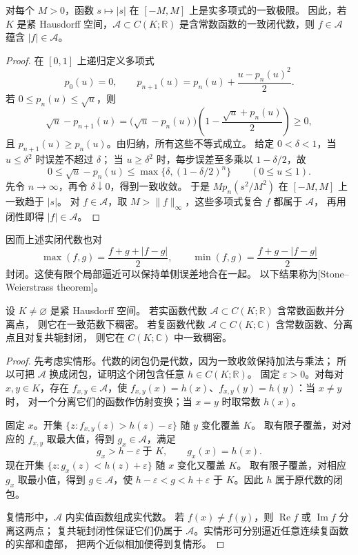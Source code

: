 \begin{lemma}[绝对值的多项式逼近]
\label{b1:lem:29-absolute-polynomial}
对每个 \(M>0\)，函数 \(s\mapsto|s|\) 在 \([-M,M]\) 上是实多项式的一致极限。
因此，若 \(K\) 是紧 Hausdorff 空间，\(\mathcal A\subset C(K;\mathbb R)\)
是含常数函数的一致闭代数，则 \(f\in\mathcal A\) 蕴含 \(|f|\in\mathcal A\)。
\end{lemma}
\begin{proof}
在 \([0,1]\) 上递归定义多项式
\[
 p_0(u)=0,\qquad p_{n+1}(u)=p_n(u)+\frac{u-p_n(u)^2}{2}.
\]
若 \(0\leq p_n(u)\leq\sqrt u\)，则
\[
 \sqrt u-p_{n+1}(u)
 =\bigl(\sqrt u-p_n(u)\bigr)
  \left(1-\frac{\sqrt u+p_n(u)}2\right)\geq0,
\]
且 \(p_{n+1}(u)\geq p_n(u)\)。由归纳，所有这些不等式成立。
给定 \(0<\delta<1\)，当 \(u\leq\delta^2\) 时误差不超过 \(\delta\)；
当 \(u\geq\delta^2\) 时，每步误差至多乘以 \(1-\delta/2\)，故
\[
 0\leq\sqrt u-p_n(u)\leq
 \max\{\delta,(1-\delta/2)^n\}\qquad(0\leq u\leq1).
\]
先令 \(n\to\infty\)，再令 \(\delta\downarrow0\)，得到一致收敛。
于是 \(Mp_n(s^2/M^2)\) 在 \([-M,M]\) 上一致趋于 \(|s|\)。
对 \(f\in\mathcal A\)，取 \(M>\|f\|_\infty\)，这些多项式复合 \(f\) 都属于 \(\mathcal A\)，
再用闭性即得 \(|f|\in\mathcal A\)。
\end{proof}

因而上述实闭代数也对
\[
 \max(f,g)=\frac{f+g+|f-g|}{2},\qquad
 \min(f,g)=\frac{f+g-|f-g|}{2}
\]
封闭。这使有限个局部逼近可以保持单侧误差地合在一起。
以下结果称为[Stone--Weierstrass theorem]。

\begin{theorem}
\label{b1:thm:29-stone-weierstrass}
设 \(K\ne\varnothing\) 是紧 Hausdorff 空间。
若实函数代数 \(\mathcal A\subset C(K;\mathbb R)\) 含常数函数并分离点，
则它在一致范数下稠密。
若复函数代数 \(\mathcal A\subset C(K;\mathbb C)\) 含常数函数、分离点且对复共轭封闭，
则它在 \(C(K;\mathbb C)\) 中一致稠密。
\end{theorem}
\begin{proof}
先考虑实情形。代数的闭包仍是代数，因为一致收敛保持加法与乘法；
所以可把 \(\mathcal A\) 换成闭包，证明这个闭包含任意 \(h\in C(K;\mathbb R)\)。
固定 \(\varepsilon>0\)。对每对 \(x,y\in K\)，存在 \(f_{x,y}\in\mathcal A\)，使
\(f_{x,y}(x)=h(x)\)、\(f_{x,y}(y)=h(y)\)：当 \(x\ne y\) 时，
对一个分离它们的函数作仿射变换；当 \(x=y\) 时取常数 \(h(x)\)。

固定 \(x\)。开集
\(\{z:f_{x,y}(z)>h(z)-\varepsilon\}\) 随 \(y\) 变化覆盖 \(K\)。
取有限子覆盖，对对应的 \(f_{x,y}\) 取最大值，得到 \(g_x\in\mathcal A\)，满足
\[
 g_x>h-\varepsilon\ \text{于 }K,\qquad g_x(x)=h(x).
\]
现在开集 \(\{z:g_x(z)<h(z)+\varepsilon\}\) 随 \(x\) 变化又覆盖 \(K\)。
取有限子覆盖，对相应 \(g_x\) 取最小值，得到 \(g\in\mathcal A\)，使
\(h-\varepsilon<g<h+\varepsilon\) 于 \(K\)。因此 \(h\) 属于原代数的闭包。

复情形中，\(\mathcal A\) 内实值函数组成实代数。
若 \(f(x)\ne f(y)\)，则 \(\operatorname{Re}f\) 或 \(\operatorname{Im}f\) 分离这两点；
复共轭封闭性保证它们仍属于 \(\mathcal A\)。实情形可分别逼近任意连续复函数的实部和虚部，
把两个近似相加便得到复情形。
\end{proof}

